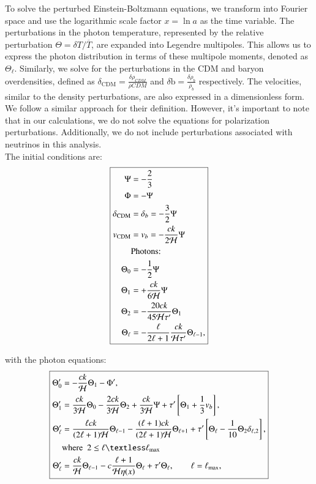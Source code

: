 \documentclass{aa}
\begin{document}
To solve the perturbed Einstein-Boltzmann equations, we transform into Fourier space and use the logarithmic scale factor $x = \ln a$ as the time variable. The perturbations in the photon temperature, represented by the relative perturbation $\Theta = \delta T/\overline{T}$, are expanded into Legendre multipoles. This allows us to express the photon distribution in terms of these multipole moments, denoted as $\Theta_\ell$. Similarly, we solve for the perturbations in the CDM and baryon overdensities, defined as $\delta_\mathrm{CDM} = \frac{\delta \rho_{CDM}}{\overline{\rho}{CDM}}$ and $\delta\mathrm{b} = \frac{\delta \rho_{b}}{\overline{\rho}_{b}}$ respectively. The velocities, similar to the density perturbations, are also expressed in a dimensionless form. We follow a similar approach for their definition. However, it's important to note that in our calculations, we do not solve the equations for polarization perturbations. Additionally, we do not include perturbations associated with neutrinos in this analysis. 
\\
The initial conditions are:
$$
\boxed{
\begin{aligned}
\Psi &= -\frac{2}{3} \\
\Phi &= -\Psi \\
\delta_{\rm CDM} &= \delta_b = -\frac{3}{2} \Psi \\
v_{\rm CDM} &= v_b = -\frac{ck}{2\mathcal{H}} \Psi \\
&\text{Photons:}\\
\Theta_0 &= -\frac{1}{2} \Psi \\
\Theta_1 &= +\frac{ck}{6\mathcal{H}}\Psi \\
\Theta_2 &= -\frac{20ck}{45\mathcal{H}\tau^\prime} \Theta_1 \\
\Theta_\ell &= -\frac{\ell}{2\ell+1} \frac{ck}{\mathcal{H}\tau^\prime} \Theta_{\ell-1},\\
\end{aligned}
}
$$

with the photon equations:
$$
\boxed{
\begin{aligned}
\Theta^\prime_0 &= -\frac{ck}{\mathcal{H}} \Theta_1 - \Phi^\prime, \\
\Theta^\prime_1 &=  \frac{ck}{3\mathcal{H}} \Theta_0 - \frac{2ck}{3\mathcal{H}}\Theta_2 +
\frac{ck}{3\mathcal{H}}\Psi + \tau^\prime\left[\Theta_1 + \frac{1}{3}v_b\right], \\
\Theta^\prime_\ell &= \frac{\ell ck}{(2\ell+1)\mathcal{H}}\Theta_{\ell-1} - \frac{(\ell+1)ck}{(2\ell+1)\mathcal{H}}
\Theta_{\ell+1} + \tau^\prime\left[\Theta_\ell - \frac{1}{10}\Theta_2
\delta_{\ell,2}\right],\\ 
& \mathrm{where} \ \ 2 \leq \ell \textless \ell_{\textrm{max}} \\
\Theta_{\ell}^\prime &= \frac{ck}{\mathcal{H}}
\Theta_{\ell-1}-c\frac{\ell+1}{\mathcal{H}\eta(x)}\Theta_\ell+\tau^\prime\Theta_\ell,
\quad\quad \ell = \ell_{\textrm{max}},\\
\end{aligned}
}
$$
\end{document}
